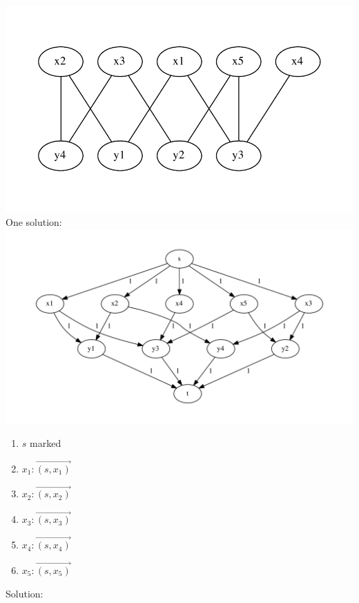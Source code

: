 \begin{example*}
\includegraphics[scale=0.7]{diagrams/Chapter4_Example2.pdf}\\
One solution:\\
\includegraphics[scale=0.7]{diagrams/Chapter4_Example3.pdf}\\
\begin{enumerate}
  \item $s$ marked
  \item $x_{1}: \overrightarrow{(s, x_{1})}$
  \item $x_{2}: \overrightarrow{(s, x_{2})}$
  \item $x_{3}: \overrightarrow{(s, x_{3})}$
  \item $x_{4}: \overrightarrow{(s, x_{4})}$
  \item $x_{5}: \overrightarrow{(s, x_{5})}$
\end{enumerate}
Solution:\\

\end{example*}
